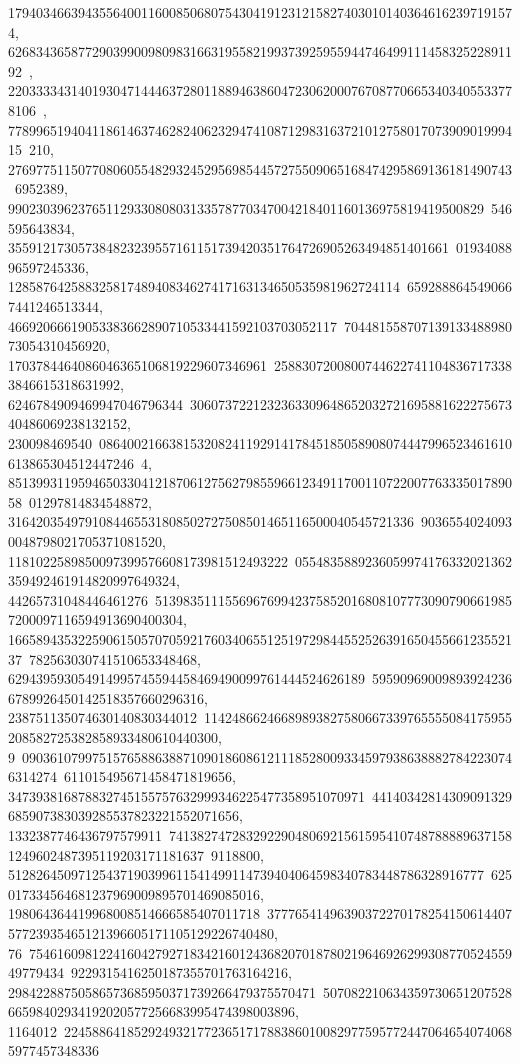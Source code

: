 {{{   1794034663943556400116008506807543041912312158274030101403646162397191574, 
   62683436587729039900980983166319558219937392595594474649911145832522891192\
, 
   2203333431401930471444637280118894638604723062000767087706653403405533778106\
, 
   77899651940411861463746282406232947410871298316372101275801707390901999415\
210, 276977511507708060554829324529569854457275509065168474295869136181490743\
6952389, 99023039623765112933080803133578770347004218401160136975819419500829\
546595643834, 355912173057384823239557161151739420351764726905263494851401661\
0193408896597245336, 12858764258832581748940834627417163134650535981962724114\
6592888645490667441246513344, 46692066619053383662890710533441592103703052117\
70448155870713913348898073054310456920, 1703784464086046365106819229607346961\
25883072008007446227411048367173383846615318631992, 6246784909469947046796344\
306073722123236330964865203272169588162227567340486069238132152, 230098469540\
08640021663815320824119291417845185058908074447996523461610613865304512447246\
4, 85139931195946503304121870612756279855966123491170011072200776333501789058\
01297814834548872, 3164203549791084465531808502727508501465116500040545721336\
90365540240930048798021705371081520, 1181022589850097399576608173981512493222\
0554835889236059974176332021362359492461914820997649324, 44265731048446461276\
5139835111556967699423758520168081077730907906619857200097116594913690400304, 
   16658943532259061505707059217603406551251972984455252639165045566123552137\
782563030741510653348468, 629439593054914995745594458469490099761444524626189\
595909690098939242366789926450142518357660296316, 238751135074630140830344012\
11424866246689893827580667339765555084175955208582725382858933480610440300, 9\
09036107997515765886388710901860861211185280093345979386388827842230746314274\
611015495671458471819656, 347393816878832745155757632999346225477358951070971\
44140342814309091329685907383039285537823221552071656, 1332387746436797579911\
74138274728329229048069215615954107487888896371581249602487395119203171181637\
9118800, 51282645097125437190399611541499114739404064598340783448786328916777\
625017334564681237969009895701469085016, 198064364419968008514666585407011718\
3777654149639037227017825415061440757723935465121396605171105129226740480, 76\
75461609812241604279271834216012436820701878021964692629930877052455949779434\
9229315416250187355701763164216, 29842288750586573685950371739266479375570471\
50708221063435973065120752866598402934192020577256683995474398003896, 1164012\
22458864185292493217723651717883860100829775957724470646540740685977457348336\
}}}
